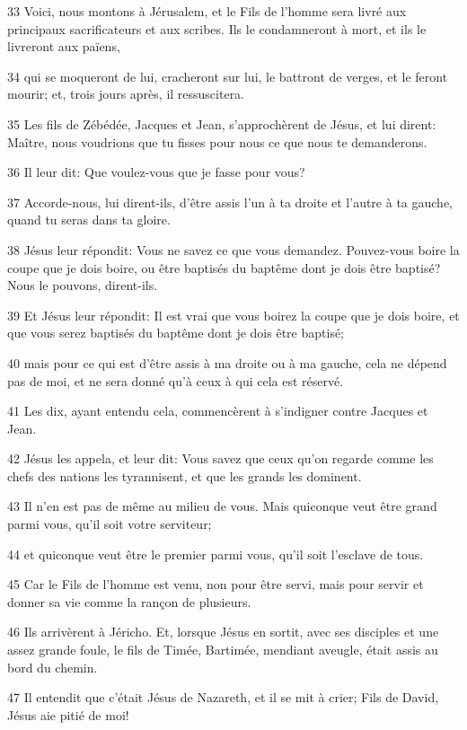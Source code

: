 \par 33 Voici, nous montons à Jérusalem, et le Fils de l'homme sera livré aux principaux sacrificateurs et aux scribes. Ils le condamneront à mort, et ils le livreront aux païens,
\par 34 qui se moqueront de lui, cracheront sur lui, le battront de verges, et le feront mourir; et, trois jours après, il ressuscitera.
\par 35 Les fils de Zébédée, Jacques et Jean, s'approchèrent de Jésus, et lui dirent: Maître, nous voudrions que tu fisses pour nous ce que nous te demanderons.
\par 36 Il leur dit: Que voulez-vous que je fasse pour vous?
\par 37 Accorde-nous, lui dirent-ils, d'être assis l'un à ta droite et l'autre à ta gauche, quand tu seras dans ta gloire.
\par 38 Jésus leur répondit: Vous ne savez ce que vous demandez. Pouvez-vous boire la coupe que je dois boire, ou être baptisés du baptême dont je dois être baptisé? Nous le pouvons, dirent-ils.
\par 39 Et Jésus leur répondit: Il est vrai que vous boirez la coupe que je dois boire, et que vous serez baptisés du baptême dont je dois être baptisé;
\par 40 mais pour ce qui est d'être assis à ma droite ou à ma gauche, cela ne dépend pas de moi, et ne sera donné qu'à ceux à qui cela est réservé.
\par 41 Les dix, ayant entendu cela, commencèrent à s'indigner contre Jacques et Jean.
\par 42 Jésus les appela, et leur dit: Vous savez que ceux qu'on regarde comme les chefs des nations les tyrannisent, et que les grands les dominent.
\par 43 Il n'en est pas de même au milieu de vous. Mais quiconque veut être grand parmi vous, qu'il soit votre serviteur;
\par 44 et quiconque veut être le premier parmi vous, qu'il soit l'esclave de tous.
\par 45 Car le Fils de l'homme est venu, non pour être servi, mais pour servir et donner sa vie comme la rançon de plusieurs.
\par 46 Ils arrivèrent à Jéricho. Et, lorsque Jésus en sortit, avec ses disciples et une assez grande foule, le fils de Timée, Bartimée, mendiant aveugle, était assis au bord du chemin.
\par 47 Il entendit que c'était Jésus de Nazareth, et il se mit à crier; Fils de David, Jésus aie pitié de moi!
